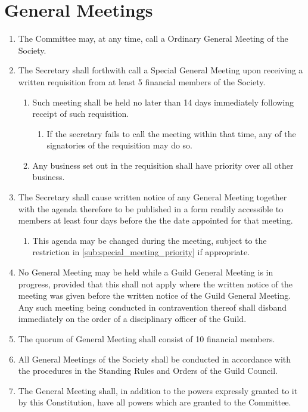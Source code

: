 \documentclass[a4paper]{article}
\begin{document}
\section{General Meetings}
\begin{enumerate}
    \item The Committee may, at any time, call a Ordinary General Meeting of the Society.
    \item The Secretary shall forthwith call a Special General Meeting upon receiving a written requisition from at least 5 financial members of the Society.
    \begin{enumerate}
        \item Such meeting shall be held no later than 14 days immediately following receipt of such requisition. 
        \begin{enumerate}
            \item If the secretary fails to call the meeting within that time, any of the signatories of the requisition may do so.
        \end{enumerate}
        \item \label{sub:special_meeting_priority} Any business set out in the requisition shall have priority over all other business. 
    \end{enumerate}
    \item The Secretary shall cause written notice of any General Meeting together with the agenda therefore to be published in a form readily accessible to members at least four days before the the date appointed for that meeting.
    \begin{enumerate}
        \item This agenda may be changed during the meeting, subject to the restriction in \cref{sub:special_meeting_priority} if appropriate.
    \end{enumerate}
    \item No General Meeting may be held while a Guild General Meeting is in progress, provided that this shall not apply where the written notice of the meeting was given before the written notice of the Guild General Meeting. Any such meeting being conducted in contravention thereof shall disband immediately on the order of a disciplinary officer of the Guild.
    \item The quorum of General Meeting shall consist of 10 financial members.
    \item All General Meetings of the Society shall be conducted in accordance with the procedures in the Standing Rules and Orders of the Guild Council.
    \item The General Meeting shall, in addition to the powers expressly granted to it by this Constitution, have all powers which are granted to the Committee.
\end{enumerate}
\end{document}
